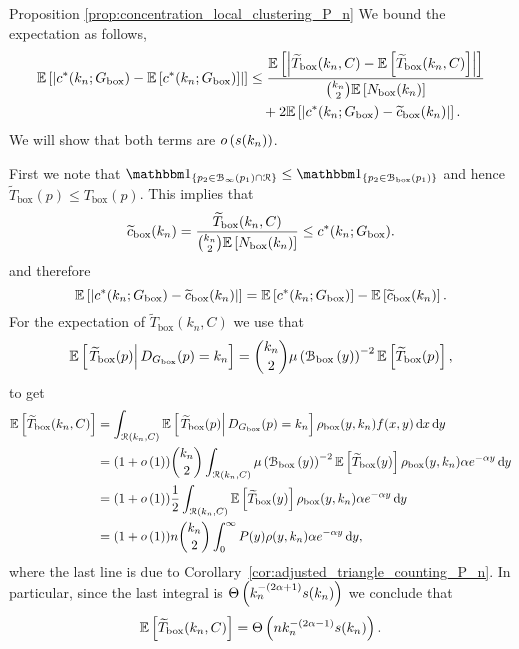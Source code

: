 \begin{proofof}{Proposition \ref{prop:concentration_local_clustering_P_n}}
We bound the expectation as follows,
\begin{align*}
	\mathbb{E}\left[\left|c^\ast(k_n; G_{\mathrm{box}}) - \mathbb{E}\left[c^\ast(k_n; G_{\mathrm{box}})\right]\right|\right] 
	&\le \frac{\mathbb{E}\left[\left|\widetilde{T}_{\text{box}}(k_n,C) - \mathbb{E}\left[\widetilde{T}_{\text{box}}(k_n,C)\right]\right|\right]}
		{\binom{k_n}{2}\mathbb{E}\left[N_{\text{box}}(k_n)\right]}\\
	&\hspace{10pt} + 2 \mathbb{E}\left[\left|c^\ast(k_n; G_{\mathrm{box}}) - \widetilde{c}_{\text{box}}(k_n)\right|\right].
\end{align*}
We will show that both terms are $o\left(s(k_n)\right)$.

First we note that $\ind{p_2 \in \BallPo{p_1} \cap \Rcal} \le \ind{p_2 \in \BallPon{p_1}}$ and hence $\widetilde{T}_{\text{box}}(p) \le T_{\text{box}}(p)$. This implies that
\[
	 \widetilde{c}_{\text{box}}(k_n) = \frac{\widetilde{T}_{\text{box}}(k_n,C)}{\binom{k_n}{2}\mathbb{E}\left[N_{\text{box}}(k_n)\right]} \le c^\ast(k_n; G_{\mathrm{box}}). 
\]
and therefore
\[
	\mathbb{E}\left[\left|c^\ast(k_n; G_{\mathrm{box}}) - \widetilde{c}_{\text{box}}(k_n)\right|\right]
	= \mathbb{E}\left[c^\ast(k_n; G_{\mathrm{box}})\right] - \mathbb{E}\left[\widetilde{c}_{\text{box}}(k_n)\right].
\]
For the expectation of $\widetilde{T}_{\text{box}}(k_n,C)$ we use that 
\[
	\mathbb{E}\left[\left.\widetilde{T}_{\text{box}}(p)\right|D_{G_{\mathrm{box}}}(p) = k_n\right]
= \binom{k_n}{2} \mu\left({\mathcal B}_{\text{box}}\left(y\right)\right)^{-2} \mathbb{E}\left[\widetilde{T}_{\text{box}}(p)\right],
\] 
to get
\begin{align*}
	\mathbb{E}\left[\widetilde{T}_{\text{box}}(k_n,C)\right] 
	&= \int_{{\mathcal R}(k_n,C)} \mathbb{E}\left[\left.\widetilde{T}_{\text{box}}(p)\right|D_{G_{\mathrm{box}}}(p) = k_n\right]
		\rho_{\text{box}}(y,k_n) f(x,y) \operatorname{\mathrm{d}\hspace{-2pt}} x \operatorname{\mathrm{d}\hspace{-2pt}} y\\
	&= (1+o\left(1\right)) \binom{k_n}{2} \int_{{\mathcal R}(k_n,C)} \mu\left({\mathcal B}_{\text{box}}\left(y\right)\right)^{-2} \mathbb{E}\left[\widetilde{T}_{\text{box}}(y)\right]
		\rho_{\text{box}}(y,k_n) \alpha e^{-\alpha y} \operatorname{\mathrm{d}\hspace{-2pt}} y\\
	&= (1+o\left(1\right)) \frac{1}{2} \int_{{\mathcal R}(k_n,C)} \mathbb{E}\left[\widetilde{T}_{\text{box}}(y)\right]
			\rho_{\text{box}}(y,k_n) \alpha e^{-\alpha y} \operatorname{\mathrm{d}\hspace{-2pt}} y\\
	&= (1+o\left(1\right)) n \binom{k_n}{2} \int_0^\infty P(y) \rho(y,k_n) \alpha e^{-\alpha y} \operatorname{\mathrm{d}\hspace{-2pt}} y,
\end{align*}
where the last line is due to Corollary~\ref{cor:adjusted_triangle_counting_P_n}. In particular, since the last integral is $\Theta\left(k_n^{-(2\alpha + 1)} s(k_n)\right)$ we conclude that
\begin{equation}\label{eq:scaling_exected_tilde_T}
	\mathbb{E}\left[\widetilde{T}_{\text{box}}(k_n,C)\right] = \Theta\left(n k_n^{-(2\alpha - 1)}s(k_n)\right). 
\end{equation}


\end{proofof}
